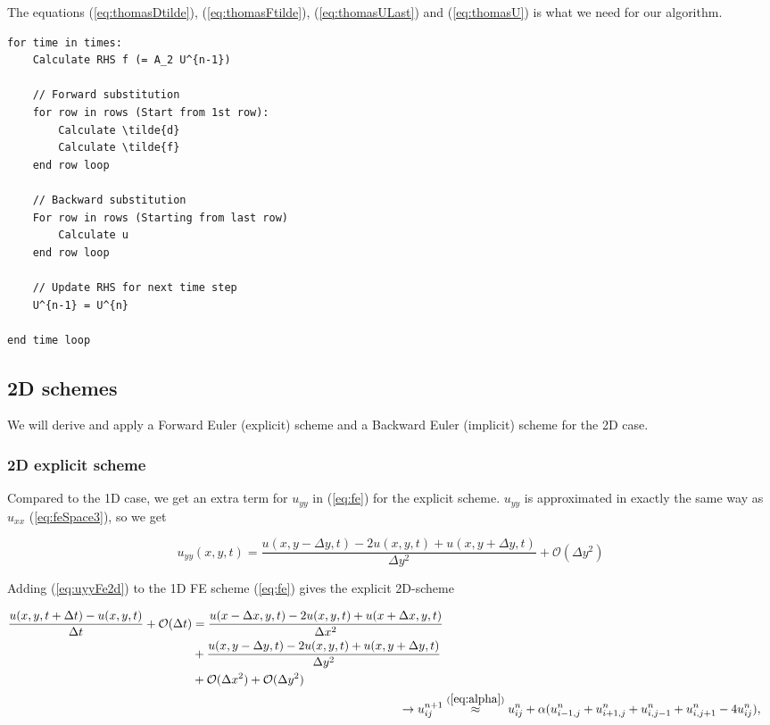 \documentclass{article}
\begin{document}
The equations (\ref{eq:thomasDtilde}), (\ref{eq:thomasFtilde}), (\ref{eq:thomasULast}) and (\ref{eq:thomasU}) is what we need for our algorithm.

\begin{lstlisting}
for time in times:
	Calculate RHS f (= A_2 U^{n-1})
	
	// Forward substitution
	for row in rows (Start from 1st row):
		Calculate \tilde{d}
		Calculate \tilde{f}
	end row loop
	
	// Backward substitution
	For row in rows (Starting from last row)
		Calculate u
	end row loop

	// Update RHS for next time step
	U^{n-1} = U^{n}

end time loop
\end{lstlisting}

\subsection{2D schemes}
We will derive and apply a Forward Euler (explicit) scheme and a Backward Euler (implicit) scheme for the 2D case.

\subsubsection{2D explicit scheme}
Compared to the 1D case, we get an extra term for $u_{yy}$ in (\ref{eq:fe}) for the explicit scheme. $u_{yy}$ is approximated in exactly the same way as $u_{xx}$ (\ref{eq:feSpace3}), so we get

\begin{equation}
	 u_{yy}(x,y,t) = \frac{u(x,y - \Delta y, t) - 2u(x,y,t) + u(x,y+ \Delta y, t)}{\Delta y^2} + \mathcal{O}(\Delta y^2)\label{eq:uyyFe2d}
\end{equation}

Adding (\ref{eq:uyyFe2d}) to the 1D FE scheme (\ref{eq:fe}) gives the explicit 2D-scheme

\begin{subequations}
	\begin{align}
		\begin{split}
			\frac{u(x,y, t+ \Delta t) - u(x,y,t)}{\Delta t} + \mathcal{O}(\Delta t) &= 
			\frac{u(x - \Delta x, y,t) - 2u(x,y,t) + u(x+ \Delta x,y, t)}{\Delta x^2} \\
			&+  \frac{u(x,y - \Delta y, t) - 2u(x,y,t) + u(x,y+ \Delta y, t)}{\Delta y^2} \\
			&+ \mathcal{O}(\Delta x^2)  + \mathcal{O}(\Delta y^2)
		\end{split}\\
		\rightarrow u_{ij}^{n+1} &\stackrel{(\ref{eq:alpha})}{\approx} u_{ij}^{n} + \alpha (u_{i-1,j}^n + u_{i+1,j}^n + u_{i,j-1}^n + u_{i,j+1}^n - 4u_{ij}^n),\label{eq:Fe2d}
	\end{align}
\end{subequations}
\end{document}
